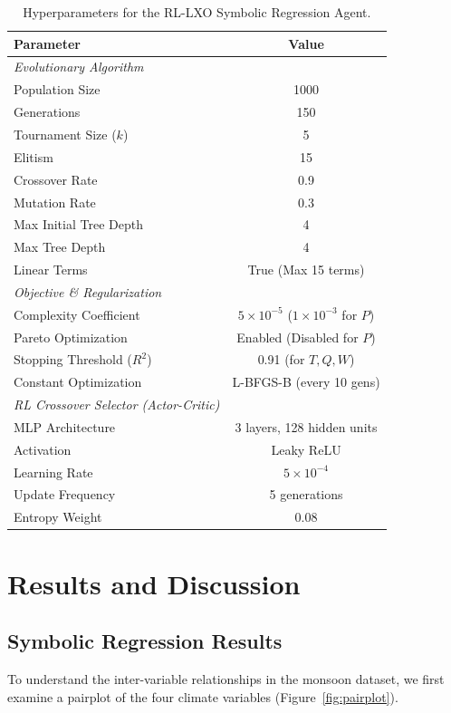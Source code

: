 \documentclass{article}
\begin{document}
\begin{table}[H]
\centering
\label{sec:appendix_hyperparams}
\caption{Hyperparameters for the RL-LXO Symbolic Regression Agent.}
\label{tab:hyperparams}
\begin{tabular}{lc}
\toprule
\textbf{Parameter} & \textbf{Value} \\
\midrule
\textit{Evolutionary Algorithm} & \\
Population Size & 1000 \\
Generations & 150 \\
Tournament Size ($k$) & 5 \\
Elitism & 15 \\
Crossover Rate & 0.9 \\
Mutation Rate & 0.3 \\
Max Initial Tree Depth & 4 \\
Max Tree Depth & 4 \\
Linear Terms & True (Max 15 terms) \\
\midrule
\textit{Objective \& Regularization} & \\
Complexity Coefficient & $5 \times 10^{-5}$ ($1 \times 10^{-3}$ for $P$) \\
Pareto Optimization & Enabled (Disabled for $P$) \\
Stopping Threshold ($R^2$) & 0.91 (for $T, Q, W$) \\
Constant Optimization & L-BFGS-B (every 10 gens) \\
\midrule
\textit{RL Crossover Selector (Actor-Critic)} & \\
MLP Architecture & 3 layers, 128 hidden units \\
Activation & Leaky ReLU \\
Learning Rate & $5 \times 10^{-4}$ \\
Update Frequency & 5 generations \\
Entropy Weight & 0.08 \\
\bottomrule
\end{tabular}
\end{table}

\section{Results and Discussion}
\subsection{Symbolic Regression Results}
To understand the inter-variable relationships in the monsoon dataset, we first examine a pairplot of the four climate variables (Figure~\ref{fig:pairplot}).
\end{document}
